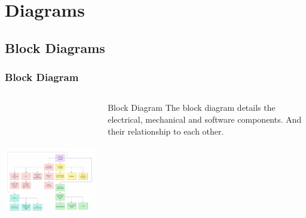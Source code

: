 \documentclass[aspectratio=169]{beamer}
\begin{document}
\section{Diagrams}
\subsection{Block Diagrams}
\begin{frame}
    \frametitle{Block Diagram}

    \begin{columns}
        \begin{column}{0.70\textwidth}
            \includegraphics[height=7cm]{BlockDiagram}
        \end{column}

        \begin{column}{0.30\textwidth}
            \begin{block}{Block Diagram}
                The block diagram details the electrical, mechanical and software components.
                And their relationship to each other.
            \end{block}
        \end{column}
    \end{columns}


\end{frame}
\end{document}
